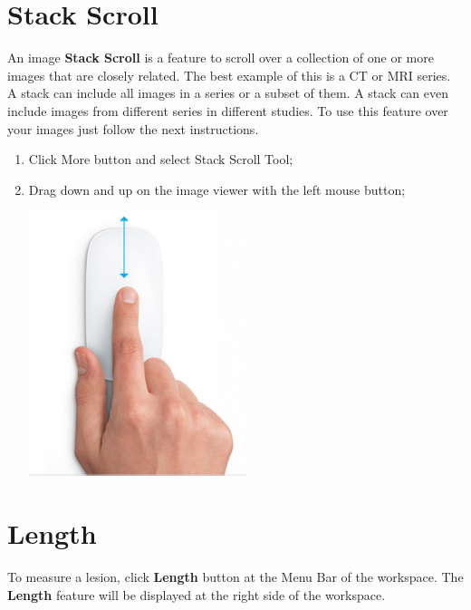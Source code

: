 \documentclass{tufte-book} %
\begin{document}
\chapter{Stack Scroll}

An image \textbf{Stack Scroll} is a feature to scroll over a collection of one or more images that are closely related. The best example of this is a CT or MRI series. A stack can include all images in a series or a subset of them. A stack can even include images from different series in different studies. To use this feature over your images just follow the next instructions.

\begin{enumerate}

\item Click More button and select Stack Scroll Tool;

\item Drag down and up on the image viewer with the left mouse button;

\hfill

\begin{center}
\includegraphics[width=0.50\textwidth]{graphics/mouse-up-down.png}
\end{center}

\hfill

\end{enumerate}

\chapter{Length}

To measure a lesion, click \textbf{Length} button at the Menu Bar of the workspace. The \textbf{Length} feature will be displayed at the right side of the workspace.
\end{document}
